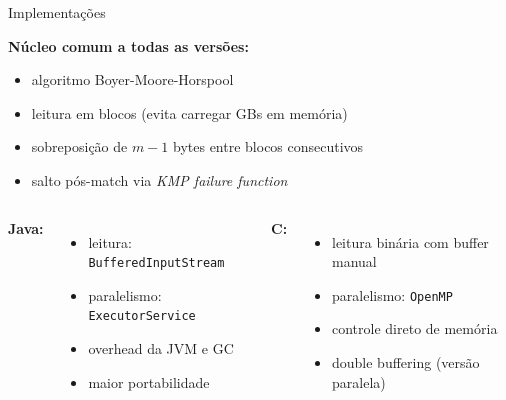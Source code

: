 \documentclass{beamer}
\begin{document}
\begin{frame}{Implementações}

\textbf{Núcleo comum a todas as versões:}
\begin{itemize}
    \item algoritmo Boyer-Moore-Horspool
    \item leitura em blocos (evita carregar GBs em memória)
    \item sobreposição de $m-1$ bytes entre blocos consecutivos
    \item salto pós-match via \textit{KMP failure function}
\end{itemize}

\vspace{0.3cm}

\begin{columns}
    \textbf{Java:}
    \begin{itemize}
        \item leitura: \texttt{BufferedInputStream}
        \item paralelismo: \texttt{ExecutorService}
        \item overhead da JVM e GC
        \item maior portabilidade
    \end{itemize}

    \textbf{C:}
    \begin{itemize}
        \item leitura binária com buffer manual
        \item paralelismo: \texttt{OpenMP}
        \item controle direto de memória
        \item double buffering (versão paralela)
    \end{itemize}
\end{columns}

\vspace{0.3cm}

\end{frame}
\end{document}
